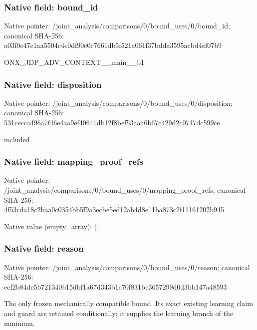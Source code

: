 \documentclass[10pt,a4paper]{article}
\begin{document}
\subsubsection{Native field: bound\_\allowbreak{}id}
Native pointer: /joint\_\allowbreak{}analysis/comparisons/0/bound\_\allowbreak{}uses/0/bound\_\allowbreak{}id; canonical SHA-256: a03f0e47c1aa5504c4e0df90c0c7661db5f521a061f37bdda3595acbd4ef07b9

\begingroup\raggedright\sloppy ONX\_\allowbreak{}JDP\_\allowbreak{}ADV\_\allowbreak{}CONTEXT\_\allowbreak{}\_\allowbreak{}main\_\allowbreak{}\_\allowbreak{}b1\par\endgroup

\subsubsection{Native field: disposition}
Native pointer: /joint\_\allowbreak{}analysis/comparisons/0/bound\_\allowbreak{}uses/0/disposition; canonical SHA-256: 531cecca496a7f46e4aa9ef40641db12f8bef53aaa6b67c429d2c0717dc599ce

\begingroup\raggedright\sloppy included\par\endgroup

\subsubsection{Native field: mapping\_\allowbreak{}proof\_\allowbreak{}refs}
Native pointer: /joint\_\allowbreak{}analysis/comparisons/0/bound\_\allowbreak{}uses/0/mapping\_\allowbreak{}proof\_\allowbreak{}refs; canonical SHA-256: 4f53cda18c2baa0c0354bb5f9a3ecbe5ed12ab4d8e11ba873c2f11161202b945

Native value (empty\_\allowbreak{}array): []

\subsubsection{Native field: reason}
Native pointer: /joint\_\allowbreak{}analysis/comparisons/0/bound\_\allowbreak{}uses/0/reason; canonical SHA-256: ecf2b84de5b721340b15dbf1a67d343b1c70f831bc3657299d0d3bb147a48593

\begingroup\raggedright\sloppy The only frozen mechanically compatible bound. Its exact existing learning claim and guard are retained conditionally;\allowbreak{} it supplies the learning branch of the minimum.\par\endgroup
\end{document}
